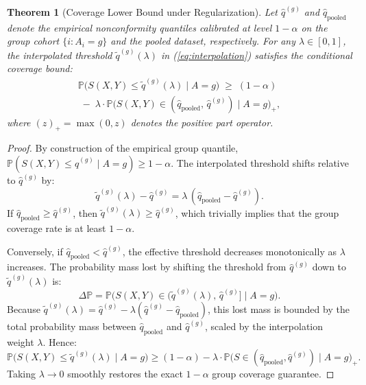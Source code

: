 \documentclass[conference]{IEEEtran}
\newtheorem{theorem}{Theorem}
\begin{document}
\begin{theorem}[Coverage Lower Bound under Regularization]
\label{thm:bound}
Let $\hat{q}^{(g)}$ and $\hat{q}_{\text{pooled}}$ denote the empirical nonconformity quantiles calibrated at level $1 - \alpha$ on the group cohort $\{i : A_i = g\}$ and the pooled dataset, respectively. For any $\lambda \in [0, 1]$, the interpolated threshold $\tilde{q}^{(g)}(\lambda)$ in (\ref{eq:interpolation}) satisfies the conditional coverage bound:
\begin{equation}
\begin{split}
\mathbb{P}\bigl(S(X, Y) \le \tilde{q}^{(g)}(\lambda) \mid A = g\bigr) \;\ge\; (1 - \alpha) \\
\;-\; \lambda \cdot \mathbb{P}\bigl(S(X, Y) \in (\hat{q}_{\text{pooled}},\, \hat{q}^{(g)}) \mid A = g\bigr)_+,
\end{split}
\end{equation}
where $(z)_+ = \max(0, z)$ denotes the positive part operator.
\end{theorem}

\begin{proof}
By construction of the empirical group quantile, $\mathbb{P}(S(X, Y) \le \hat{q}^{(g)} \mid A = g) \ge 1 - \alpha$. The interpolated threshold shifts relative to $\hat{q}^{(g)}$ by:
\begin{equation*}
\tilde{q}^{(g)}(\lambda) - \hat{q}^{(g)} = \lambda\,(\hat{q}_{\text{pooled}} - \hat{q}^{(g)}).
\end{equation*}
If $\hat{q}_{\text{pooled}} \ge \hat{q}^{(g)}$, then $\tilde{q}^{(g)}(\lambda) \ge \hat{q}^{(g)}$, which trivially implies that the group coverage rate is at least $1 - \alpha$. 

Conversely, if $\hat{q}_{\text{pooled}} < \hat{q}^{(g)}$, the effective threshold decreases monotonically as $\lambda$ increases. The probability mass lost by shifting the threshold from $\hat{q}^{(g)}$ down to $\tilde{q}^{(g)}(\lambda)$ is:
\begin{equation*}
\Delta \mathbb{P} = \mathbb{P}\bigl(S(X, Y) \in (\tilde{q}^{(g)}(\lambda),\, \hat{q}^{(g)}] \mid A = g\bigr).
\end{equation*}
Because $\tilde{q}^{(g)}(\lambda) = \hat{q}^{(g)} - \lambda(\hat{q}^{(g)} - \hat{q}_{\text{pooled}})$, this lost mass is bounded by the total probability mass between $\hat{q}_{\text{pooled}}$ and $\hat{q}^{(g)}$, scaled by the interpolation weight $\lambda$. Hence:
\begin{equation*}
\mathbb{P}\bigl(S(X, Y) \le \tilde{q}^{(g)}(\lambda) \mid A = g\bigr) \ge (1 - \alpha) - \lambda \cdot \mathbb{P}\bigl(S \in (\hat{q}_{\text{pooled}}, \hat{q}^{(g)}) \mid A = g\bigr)_+.
\end{equation*}
Taking $\lambda \to 0$ smoothly restores the exact $1 - \alpha$ group coverage guarantee.
\end{proof}
\end{document}
